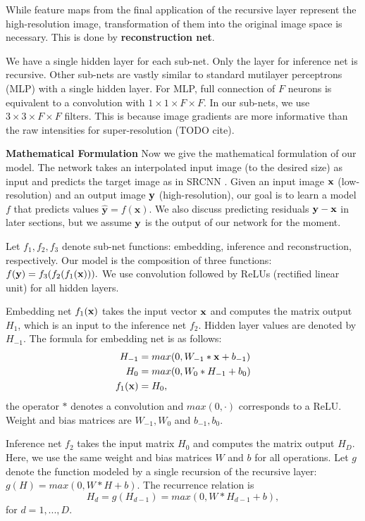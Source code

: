 \documentclass[10pt,twocolumn,letterpaper]{article}
\begin{document}
While feature maps from the final application of the recursive layer represent the high-resolution image, transformation of them into the original image space is necessary. This is done by \textbf{reconstruction net}.  

We have a single hidden layer for each sub-net. Only the layer for inference net is recursive. Other sub-nets are vastly similar to standard mutilayer perceptrons (MLP) with a single hidden layer. For MLP, full connection of $F$ neurons is equivalent to a convolution with $1\times 1\times F \times F$. In our sub-nets, we use $3\times 3\times F \times F$ filters. This is because image gradients are more informative than the raw intensities for super-resolution  (TODO cite).

\textbf{Mathematical Formulation} Now we give the mathematical formulation of our model. The network takes an interpolated input image (to the desired size) as input and predicts the target image as in SRCNN \cite{Dong2014}. Given an input image ${\bf x}$ (low-resolution) and an output image ${\bf y}$ (high-resolution), our goal is to learn a model $f$ that predicts values $\mathbf{\hat{y}}=f(\mathbf{x})$.  We also discuss predicting residuals ${\bf y - x} $ in later sections, but we assume ${\bf y}$ is the output of our network for the moment.

 Let $f_1, f_2, f_3$ denote sub-net functions: embedding, inference and reconstruction, respectively. Our model is the composition of three functions: $f({\bf y}) = f_3(f_2 (f_1({\bf x}))).$ We use convolution followed by ReLUs (rectified linear unit) for all hidden layers. 
 
 Embedding net $f_1({\bf x})$ takes the input vector ${\bf x}$ and computes the matrix output $H_1$, which is an input to the inference net $f_2$. Hidden layer values are denoted by $H_{-1}$. The formula for embedding net is as follows:
  \begin{align}
        H_{-1} &= max(0, W_{-1}*{\bf x} + b_{-1})\\
        H_0 &= max(0, W_{0}*H_{-1} + b_0)\\
        f_1({\bf x}) &= H_0,
    \end{align}
the operator $*$ denotes a convolution and $max(0,\cdot)$ corresponds to a ReLU. Weight and bias matrices are $W_{-1},W_0$ and $b_{-1},b_0$.

Inference net $f_2$ takes the input matrix $H_0$ and computes the matrix output $H_{D}$. Here, we use the same weight and bias matrices $W$ and $b$ for all operations.  Let $g$ denote the function modeled by a single recursion of the recursive layer: $g(H)=max(0,W*H+b)$. The recurrence relation is  
\begin{equation}
 H_d = g(H_{d-1}) = max(0,W*H_{d-1}+b),
\end{equation}
for $d = 1, ..., D$. 
\end{document}
